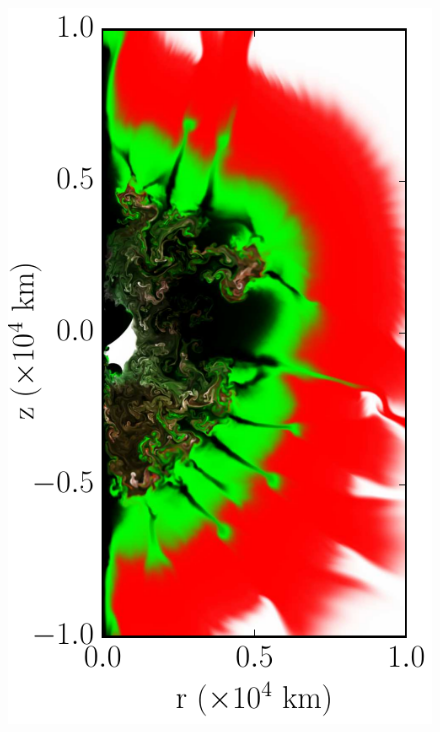 \documentclass[iop,apj]{emulateapj}
\begin{document}
\begin{figure}[!ht]
\begin{minipage}{0.24\textwidth}
    \includegraphics[width=\linewidth]{"figures/samples/cone_400k_m16_a12_0200"}
  \end{minipage} \hfill 
  \begin{minipage}{0.24\textwidth}

\end{minipage}
\end{figure}
\end{document}
